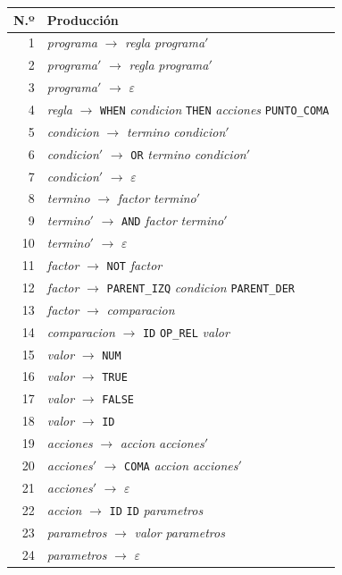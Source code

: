 \begin{longtable}{@{}r p{11cm}@{}}
\toprule
\textbf{N.º} & \textbf{Producción} \\
\midrule
\endhead
1 & \textit{programa} $\rightarrow$ \textit{regla} \textit{programa}$'$ \\
2 & \textit{programa}$'$ $\rightarrow$ \textit{regla} \textit{programa}$'$ \\
3 & \textit{programa}$'$ $\rightarrow$ $\varepsilon$ \\
4 & \textit{regla} $\rightarrow$ \texttt{WHEN} \textit{condicion} \texttt{THEN} \textit{acciones} \texttt{PUNTO\_COMA} \\
5 & \textit{condicion} $\rightarrow$ \textit{termino} \textit{condicion}$'$ \\
6 & \textit{condicion}$'$ $\rightarrow$ \texttt{OR} \textit{termino} \textit{condicion}$'$ \\
7 & \textit{condicion}$'$ $\rightarrow$ $\varepsilon$ \\
8 & \textit{termino} $\rightarrow$ \textit{factor} \textit{termino}$'$ \\
9 & \textit{termino}$'$ $\rightarrow$ \texttt{AND} \textit{factor} \textit{termino}$'$ \\
10 & \textit{termino}$'$ $\rightarrow$ $\varepsilon$ \\
11 & \textit{factor} $\rightarrow$ \texttt{NOT} \textit{factor} \\
12 & \textit{factor} $\rightarrow$ \texttt{PARENT\_IZQ} \textit{condicion} \texttt{PARENT\_DER} \\
13 & \textit{factor} $\rightarrow$ \textit{comparacion} \\
14 & \textit{comparacion} $\rightarrow$ \texttt{ID} \texttt{OP\_REL} \textit{valor} \\
15 & \textit{valor} $\rightarrow$ \texttt{NUM} \\
16 & \textit{valor} $\rightarrow$ \texttt{TRUE} \\
17 & \textit{valor} $\rightarrow$ \texttt{FALSE} \\
18 & \textit{valor} $\rightarrow$ \texttt{ID} \\
19 & \textit{acciones} $\rightarrow$ \textit{accion} \textit{acciones}$'$ \\
20 & \textit{acciones}$'$ $\rightarrow$ \texttt{COMA} \textit{accion} \textit{acciones}$'$ \\
21 & \textit{acciones}$'$ $\rightarrow$ $\varepsilon$ \\
22 & \textit{accion} $\rightarrow$ \texttt{ID} \texttt{ID} \textit{parametros} \\
23 & \textit{parametros} $\rightarrow$ \textit{valor} \textit{parametros} \\
24 & \textit{parametros} $\rightarrow$ $\varepsilon$ \\
\bottomrule
\end{longtable}

